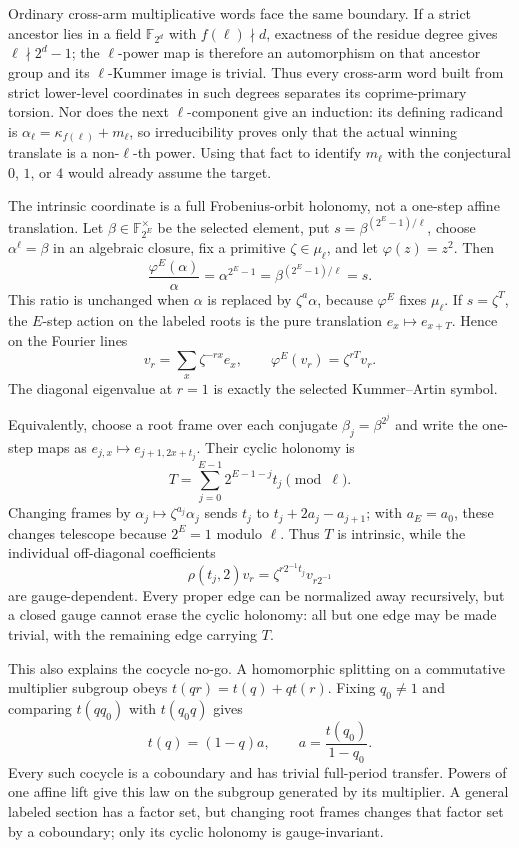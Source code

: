 \documentclass[11pt]{article}
\theoremstyle{definition}
\theoremstyle{remark}
\begin{document}
Ordinary cross-arm multiplicative words face the same boundary.  If a strict
ancestor lies in a field $\mathbb F_{2^d}$ with $f(\ell)\nmid d$, exactness
of the residue degree gives
$\ell\nmid2^d-1$; the $\ell$-power map is therefore an automorphism on that
ancestor group and its $\ell$-Kummer image is trivial.  Thus every cross-arm
word built from strict lower-level coordinates in such degrees separates its
coprime-primary torsion.  Nor does the next $\ell$-component give an induction:
its defining radicand is
$\alpha_\ell=\kappa_{f(\ell)}+m_\ell$, so irreducibility proves only that the
actual winning translate is a non-$\ell$-th power.  Using that fact to identify
$m_\ell$ with the conjectural $0$, $1$, or $4$ would already assume the target.

The intrinsic coordinate is a full Frobenius-orbit holonomy, not a one-step
affine translation.  Let $\beta\in\mathbb F_{2^E}^\times$ be the selected
element, put $s=\beta^{(2^E-1)/\ell}$, choose $\alpha^\ell=\beta$ in an
algebraic closure, fix a primitive $\zeta\in\mu_\ell$, and let
$\varphi(z)=z^2$.  Then
\[
 \frac{\varphi^E(\alpha)}{\alpha}
 =\alpha^{2^E-1}
 =\beta^{(2^E-1)/\ell}=s.
\]
This ratio is unchanged when $\alpha$ is replaced by $\zeta^a\alpha$,
because $\varphi^E$ fixes $\mu_\ell$.  If $s=\zeta^T$, the $E$-step action
on the labeled roots is the pure translation $e_x\mapsto e_{x+T}$.  Hence on
the Fourier lines
\[
 v_r=\sum_x\zeta^{-rx}e_x,
 \qquad \varphi^E(v_r)=\zeta^{rT}v_r.
\]
The diagonal eigenvalue at $r=1$ is exactly the selected Kummer--Artin
symbol.

Equivalently, choose a root frame over each conjugate
$\beta_j=\beta^{2^j}$ and write the one-step maps as
$e_{j,x}\mapsto e_{j+1,2x+t_j}$.  Their cyclic holonomy is
\[
 T=\sum_{j=0}^{E-1}2^{E-1-j}t_j\pmod\ell.
\]
Changing frames by $\alpha_j\mapsto\zeta^{a_j}\alpha_j$ sends
$t_j$ to $t_j+2a_j-a_{j+1}$; with $a_E=a_0$, these changes telescope because
$2^E=1$ modulo $\ell$.  Thus $T$ is intrinsic, while the individual
off-diagonal coefficients
\[
 \rho(t_j,2)v_r=\zeta^{r2^{-1}t_j}v_{r2^{-1}}
\]
are gauge-dependent.  Every proper edge can be normalized away recursively,
but a closed gauge cannot erase the cyclic holonomy: all but one edge may be
made trivial, with the remaining edge carrying $T$.

This also explains the cocycle no-go.  A homomorphic splitting on a
commutative multiplier subgroup obeys
$t(qr)=t(q)+q t(r)$.  Fixing $q_0\ne1$ and comparing
$t(qq_0)$ with $t(q_0q)$ gives
\[
 t(q)=(1-q)a,
 \qquad a=\frac{t(q_0)}{1-q_0}.
\]
Every such cocycle is a coboundary and has trivial full-period transfer.
Powers of one affine lift give this law on the subgroup generated by its
multiplier.  A general labeled section has a factor set, but changing root
frames changes that factor set by a coboundary; only its cyclic holonomy is
gauge-invariant.
\end{document}
